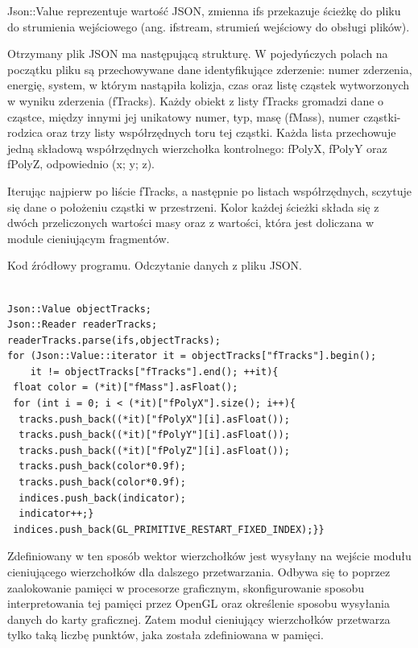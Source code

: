 Json::Value reprezentuje wartość JSON, zmienna ifs przekazuje ścieżkę do pliku do strumienia wejściowego (ang. ifstream, strumień wejściowy do obsługi plików). 

Otrzymany plik JSON ma następującą strukturę. W pojedyńczych polach na początku pliku są przechowywane dane identyfikujące zderzenie: numer zderzenia, energię, system, w którym nastąpiła kolizja, czas oraz listę cząstek wytworzonych w wyniku zderzenia (fTracks). Każdy obiekt z listy fTracks gromadzi dane o cząstce, między innymi jej unikatowy numer, typ, masę (fMass), numer cząstki-rodzica oraz trzy listy współrzędnych toru tej cząstki. Każda lista przechowuje jedną składową współrzędnych wierzchołka kontrolnego: fPolyX, fPolyY oraz fPolyZ, odpowiednio (x; y; z). 

Iterując najpierw po liście fTracks, a następnie po listach współrzędnych, sczytuje się dane o położeniu cząstki w przestrzeni. Kolor każdej ścieżki składa się z dwóch przeliczonych wartości masy oraz z wartości, która jest doliczana w module cieniującym fragmentów.    

\begin{table}[H]
\caption{Kod źródłowy programu. Odczytanie danych z pliku JSON.}
\label{tab6}
\begin{lstlisting}[frame=single]  % Start your code-block

Json::Value objectTracks;
Json::Reader readerTracks;
readerTracks.parse(ifs,objectTracks);
for (Json::Value::iterator it = objectTracks["fTracks"].begin(); 
	it != objectTracks["fTracks"].end(); ++it){
 float color = (*it)["fMass"].asFloat();
 for (int i = 0; i < (*it)["fPolyX"].size(); i++){
  tracks.push_back((*it)["fPolyX"][i].asFloat());
  tracks.push_back((*it)["fPolyY"][i].asFloat());
  tracks.push_back((*it)["fPolyZ"][i].asFloat());
  tracks.push_back(color*0.9f);
  tracks.push_back(color*0.9f);
  indices.push_back(indicator);
  indicator++;}
 indices.push_back(GL_PRIMITIVE_RESTART_FIXED_INDEX);}}
\end{lstlisting}
\end{table}

Zdefiniowany w ten sposób wektor wierzchołków jest wysyłany na wejście modułu cieniującego wierzchołków dla dalszego przetwarzania. Odbywa się to poprzez zaalokowanie pamięci w procesorze graficznym, skonfigurowanie sposobu interpretowania tej pamięci przez OpenGL oraz określenie sposobu wysyłania danych do karty graficznej. Zatem moduł cieniujący wierzchołków przetwarza tylko taką liczbę punktów, jaka została zdefiniowana w pamięci.

